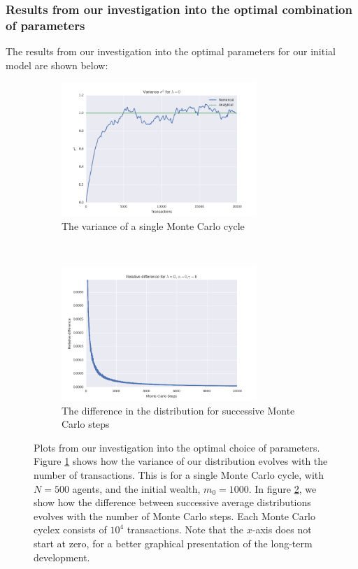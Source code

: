 \documentclass[a4paper, 10pt]{article}
\begin{document}
\subsubsection{Results from our investigation into the optimal combination of parameters}
The results from our investigation into the optimal parameters for our initial model are shown below:
\begin{figure}[!ht]
    \centering
    \begin{subfigure}[H!]{0.5\textwidth}
        \centering
        \includegraphics[height=2.0in]{varLamb0.png}
        \caption{The variance of a single Monte Carlo cycle}\label{fig:ModelA_Var}
    \end{subfigure}%
    ~ 
    \begin{subfigure}[H!]{0.5\textwidth}
        \centering
        \includegraphics[height=2.0in]{relDiffL0A0G0.png}
        \caption{The difference in the distribution for successive Monte Carlo steps}\label{fig:ModelA_MC_steps}
    \end{subfigure}
    \caption{Plots from our investigation into the optimal choice of parameters. Figure \ref{fig:ModelA_Var} shows how the variance of our distribution evolves with the number of transactions. This is for a single Monte Carlo cycle, with $N=500$ agents, and the initial wealth, $m_0=1000$. In figure \ref{fig:ModelA_MC_steps}, we show how the difference between successive average distributions evolves with the number of Monte Carlo steps. Each Monte Carlo cyclex consists of $10^4$ transactions. Note that the $x$-axis does not start at zero, for a better graphical presentation of the long-term development.}\label{fig:ModelA}
\end{figure} %
\end{document}
